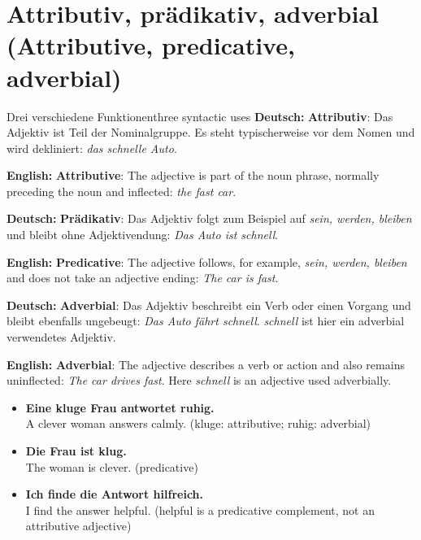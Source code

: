 \documentclass[a4paper,11pt]{article}
\newcommand{\GermanText}[1]{\textbf{Deutsch: }#1\par}
\newcommand{\EnglishText}[1]{{\small\color{SoftGray}\textbf{English: }#1\par}}
\newcommand{\ExampleItem}[2]{\item \textbf{#1}\\{\small\color{SoftGray}#2}}
\begin{document}
\section{Attributiv, prädikativ, adverbial \textnormal{(Attributive, predicative, adverbial)}}
\begin{grammarentry}{Drei verschiedene Funktionen}{three syntactic uses}
\GermanText{\textbf{Attributiv}: Das Adjektiv ist Teil der Nominalgruppe. Es steht typischerweise vor dem Nomen und wird dekliniert: \emph{das schnelle Auto}.}
\EnglishText{\textbf{Attributive}: The adjective is part of the noun phrase, normally preceding the noun and inflected: \emph{the fast car}.}
\GermanText{\textbf{Prädikativ}: Das Adjektiv folgt zum Beispiel auf \emph{sein, werden, bleiben} und bleibt ohne Adjektivendung: \emph{Das Auto ist schnell}.}
\EnglishText{\textbf{Predicative}: The adjective follows, for example, \emph{sein, werden, bleiben} and does not take an adjective ending: \emph{The car is fast}.}
\GermanText{\textbf{Adverbial}: Das Adjektiv beschreibt ein Verb oder einen Vorgang und bleibt ebenfalls ungebeugt: \emph{Das Auto fährt schnell}. \emph{schnell} ist hier ein adverbial verwendetes Adjektiv.}
\EnglishText{\textbf{Adverbial}: The adjective describes a verb or action and also remains uninflected: \emph{The car drives fast}. Here \emph{schnell} is an adjective used adverbially.}
\end{grammarentry}
\begin{exbox}\begin{itemize}
\ExampleItem{Eine kluge Frau antwortet ruhig.}{A clever woman answers calmly. (kluge: attributive; ruhig: adverbial)}
\ExampleItem{Die Frau ist klug.}{The woman is clever. (predicative)}
\ExampleItem{Ich finde die Antwort hilfreich.}{I find the answer helpful. (helpful is a predicative complement, not an attributive adjective)}
\end{itemize}\end{exbox}
\end{document}

